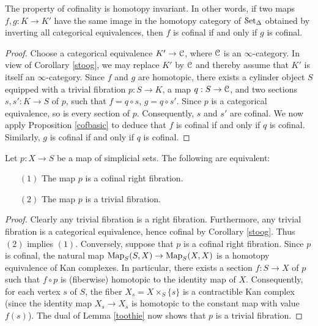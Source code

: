 \begin{corollary}\label{cofinv}
The property of cofinality is homotopy invariant. In other words,
if two maps $f,g: K \rightarrow K'$ have the same image in the
homotopy category of $\operatorname{\mathcal{S}et_{\Delta}}$ obtained by inverting all categorical
equivalences, then $f$ is cofinal if and only if $g$ is cofinal.
\end{corollary}

\begin{proof}
Choose a categorical equivalence $K' \rightarrow \operatorname{\mathcal{C}}$, where $\operatorname{\mathcal{C}}$ is an $\infty$-category.
In view of Corollary \ref{stoog}, we may replace $K'$ by $\operatorname{\mathcal{C}}$ and thereby assume that
$K'$ is itself an $\infty$-category. Since $f$ and $g$ are homotopic, there exists a cylinder
object $S$ equipped with a trivial fibration $p: S
\rightarrow K$, a map $q: S \rightarrow \operatorname{\mathcal{C}}$, and two sections
$s,s': K \rightarrow S$ of $p$, such that $f = q \circ s$, $g = q
\circ s'$. Since $p$ is a categorical equivalence, so is every
section of $p$. Consequently, $s$ and $s'$ are cofinal. We now
apply Proposition \ref{cofbasic} to deduce that $f$ is cofinal if
and only if $q$ is cofinal. Similarly, $g$ is cofinal if and only
if $q$ is cofinal.
\end{proof}

\begin{corollary}\label{twork}
Let $p: X \rightarrow S$ be a map of simplicial sets. The following are equivalent:
\begin{itemize}
\item[$(1)$] The map $p$ is a cofinal right fibration.
\item[$(2)$] The map $p$ is a trivial fibration.
\end{itemize}
\end{corollary}

\begin{proof}
Clearly any trivial fibration is a right fibration. Furthermore, any trivial fibration is
a categorical equivalence, hence cofinal by Corollary \ref{stoog}. Thus $(2)$ implies $(1)$. Conversely, suppose that $p$ is a cofinal right fibration. Since $p$ is cofinal, the natural map
$\operatorname{{Map}}_{S}(S,X) \rightarrow \operatorname{{Map}}_{S}(X,X)$ is a homotopy equivalence of Kan complexes.
In particular, there exists a section $f: S \rightarrow X$ of $p$ such that
$f \circ p$ is (fiberwise) homotopic to the identity map of $X$. Consequently, for each
vertex $s$ of $S$, the fiber $X_{s} = X \times_{S} \{s\}$ is a contractible Kan complex
(since the identity map $X_{s} \rightarrow X_{s}$ is homotopic to the constant map with value $f(s)$). The dual of Lemma \ref{toothie} now shows that $p$ is a trivial fibration.
\end{proof}


